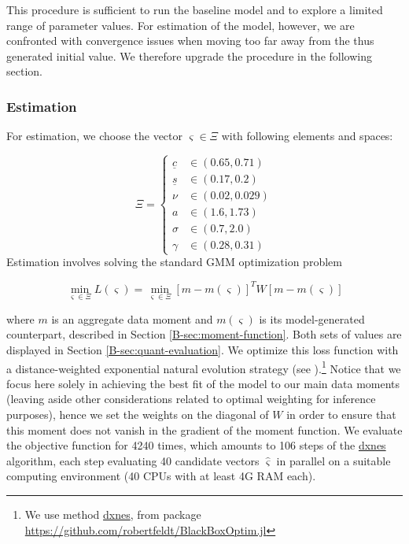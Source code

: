 \documentclass[11pt]{report}
\begin{document}
This procedure is sufficient to run the baseline model and to explore a limited range of parameter values. For estimation of the model, however, we are confronted with convergence issues when moving too far away from the thus generated initial value. 
We therefore upgrade the procedure in the following section.

\subsubsection{Estimation}\label{B-sec:estimation}

For estimation, we choose the vector $\varsigma \in \Xi$ with following elements and spaces:

\begin{equation*}
	\Xi = \begin{cases}
		\underline{c} & \in (0.65, 0.71) \\
		\underline{s} & \in (0.17, 0.2) \\
		\nu   & \in (0.02, 0.029) \\
		a      &  \in (1.6, 1.73) \\
		\sigma      &  \in (0.7, 2.0) \\
		\gamma &  \in (0.28, 0.31)
\end{cases}
\end{equation*}
Estimation involves solving the standard GMM optimization problem

\begin{equation}
	\min_{\varsigma \in \Xi} L(\varsigma) = \min_{\varsigma \in \Xi} [m - m(\varsigma)]^T W [m - m(\varsigma)]\label{B-eq:loss-function}
\end{equation}

where $m$ is an aggregate data moment and $m(\varsigma)$ is its model-generated counterpart, described in Section \ref{B-sec:moment-function}. Both sets of values are displayed in Section \ref{B-sec:quant-evaluation}. We optimize this loss function with a distance-weighted exponential natural evolution strategy (see \cite{5949614}).\footnote{We use method \url{dxnes}, from package \url{https://github.com/robertfeldt/BlackBoxOptim.jl}}
Notice that we focus here solely in achieving the best fit of the model to our main data 
moments (leaving aside other considerations related to optimal weighting for inference purposes),
hence we set the weights on the diagonal of $W$ in order to ensure that this moment does not vanish in the gradient of the moment function. We evaluate the objective function for 4240 times, which amounts to 106 steps of the \url{dxnes} algorithm, each step evaluating 40 candidate vectors $\hat{\varsigma}$ in parallel on a suitable computing environment (40 CPUs with at least 4G RAM each). 
\end{document}
